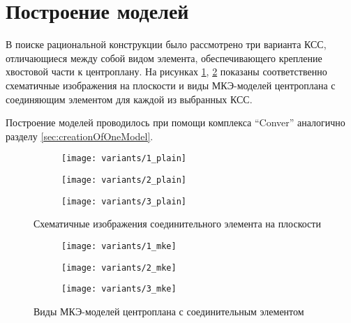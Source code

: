 \section{Построение моделей}

В поиске рациональной конструкции было рассмотрено три варианта КСС, отличающиеся между собой видом элемента, обеспечивающего крепление хвостовой части к центроплану. На рисунках \ref{fig:variants_plain}, \ref{fig:variants_mke} показаны соответственно схематичные изображения на плоскости и виды МКЭ-моделей центроплана с соединяющим элементом для каждой из выбранных КСС. 

Построение моделей проводилось при помощи комплекса ``Conver'' аналогично разделу \ref{sec:creationOfOneModel}.

\begin{figure}[H]
\centering
\begin{subfigure}[b]{0.32\textwidth}
\centering
	\texttt{[image: variants/1\_plain]}
\end{subfigure}
\hspace{\fill}
\begin{subfigure}[b]{0.32\textwidth}
\centering
	\texttt{[image: variants/2\_plain]}
\end{subfigure}
\hspace{\fill}
\begin{subfigure}[b]{0.32\textwidth}
\centering
	\texttt{[image: variants/3\_plain]}
\end{subfigure}
\hspace{\fill}
\caption{Схематичные изображения соединительного элемента на плоскости}
\label{fig:variants_plain}
\end{figure}	


\begin{figure}[H]
\centering
\begin{subfigure}[b]{0.32\textwidth}
	\texttt{[image: variants/1\_mke]}
\end{subfigure}
\hspace{\fill}
\begin{subfigure}[b]{0.32\textwidth}
	\texttt{[image: variants/2\_mke]}
\end{subfigure}
\hspace{\fill}
\begin{subfigure}[b]{0.32\textwidth}
	\texttt{[image: variants/3\_mke]}
\end{subfigure}
\hspace{\fill}
\caption{Виды МКЭ-моделей центроплана с соединительным элементом}
\label{fig:variants_mke}
\end{figure}	